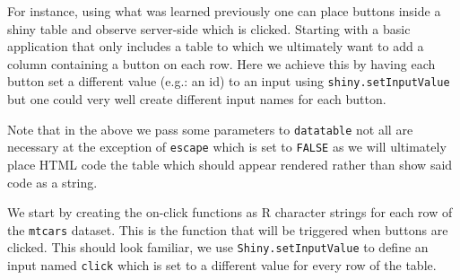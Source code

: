 \documentclass[
]{krantz}
\makeatletter
\newenvironment{Shaded}{\begin{snugshade}}{\end{snugshade}}
\newcommand{\ControlFlowTok}[1]{\textcolor[rgb]{0.27,0.27,0.27}{\textbf{#1}}}
\newcommand{\DataTypeTok}[1]{\textcolor[rgb]{0.27,0.27,0.27}{#1}}
\newcommand{\KeywordTok}[1]{\textcolor[rgb]{0.27,0.27,0.27}{\textbf{#1}}}
\newcommand{\NormalTok}[1]{#1}
\newcommand{\OperatorTok}[1]{\textcolor[rgb]{0.43,0.43,0.43}{\textbf{#1}}}
\newcommand{\OtherTok}[1]{\textcolor[rgb]{0.37,0.37,0.37}{#1}}
\newcommand{\StringTok}[1]{\textcolor[rgb]{0.5,0.5,0.5}{#1}}
\newenvironment{kframe}{%
\medskip{}
\setlength{\fboxsep}{.8em}
 \def\at@end@of@kframe{}%
 \ifinner\ifhmode%
  \def\at@end@of@kframe{\end{minipage}}%
  \begin{minipage}{\columnwidth}%
 \fi\fi%
 \def\FrameCommand##1{\hskip\@totalleftmargin \hskip-\fboxsep
 \colorbox{shadecolor}{##1}\hskip-\fboxsep
     \hskip-\linewidth \hskip-\@totalleftmargin \hskip\columnwidth}%
 \MakeFramed {\advance\hsize-\width
   \@totalleftmargin\z@ \linewidth\hsize
   \@setminipage}}%
 {\par\unskip\endMakeFramed%
 \at@end@of@kframe}
\renewenvironment{Shaded}{\begin{kframe}}{\end{kframe}}
\makeatother
\begin{document}
For instance, using what was learned previously one can place buttons inside a shiny table and observe server-side which is clicked. Starting with a basic application that only includes a table to which we ultimately want to add a column containing a button on each row. Here we achieve this by having each button set a different value (e.g.: an id) to an input using \texttt{shiny.setInputValue} but one could very well create different input names for each button.

\begin{Shaded}
\end{Shaded}

Note that in the above we pass some parameters to \texttt{datatable} not all are necessary at the exception of \texttt{escape} which is set to \texttt{FALSE} as we will ultimately place HTML code the table which should appear rendered rather than show said code as a string.

We start by creating the on-click functions as R character strings for each row of the \texttt{mtcars} dataset. This is the function that will be triggered when buttons are clicked. This should look familiar, we use \texttt{Shiny.setInputValue} to define an input named \texttt{click} which is set to a different value for every row of the table.
\end{document}
